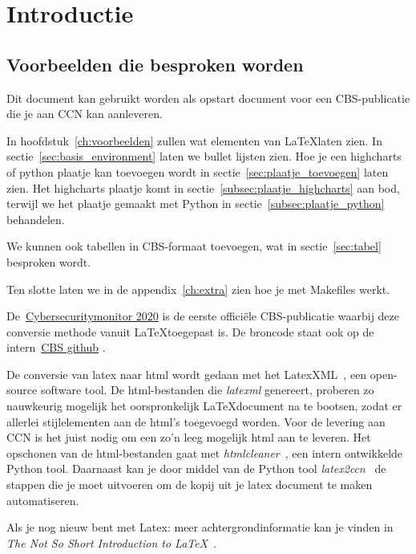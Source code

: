 \chapter{Introductie}
\label{ch:introductie}


\section{Voorbeelden die besproken worden}
Dit document kan gebruikt worden als opstart document voor een CBS-publicatie die je aan CCN kan
aanleveren.

In hoofdstuk~\ref{ch:voorbeelden}  zullen wat elementen van \LaTeX laten zien.
In sectie~\ref{sec:basis_environment} laten we bullet lijsten zien.
Hoe je een highcharts of python plaatje kan toevoegen wordt in sectie~\ref{sec:plaatje_toevoegen}
laten zien.
Het highcharts plaatje komt in sectie~\ref{subsec:plaatje_highcharts} aan bod, terwijl we het
plaatje gemaakt met Python in sectie~\ref{subsec:plaatje_python} behandelen.

We kunnen ook tabellen in CBS-formaat toevoegen, wat in sectie~\ref{sec:tabel} besproken wordt.

Ten slotte laten we in de appendix~\ref{ch:extra} zien hoe je met Makefiles werkt.

De~\href{https://github.cbsp.nl/EVLT/cybersecuritymonitor-2020}{Cybersecuritymonitor 2020}
\citep{cybersecuritymonitor_20} is de eerste officiële CBS-publicatie waarbij
deze conversie methode vanuit \LaTeX toegepast is.
De broncode staat ook op de intern~\href{https://github/evlt/cybersecuritymonitor}{CBS github}
\citep{cybersecuritymonitor_20_github}.

De conversie van latex naar html wordt gedaan met het LatexXML~\citep{latexml}, een open-source
software tool.
De html-bestanden die \emph{latexml} genereert, proberen zo nauwkeurig mogelijk het oorspronkelijk
\LaTeX document na te bootsen, zodat er allerlei stijlelementen aan de html's toegevoegd worden.
Voor de levering aan CCN is het juist nodig om een zo'n leeg mogelijk html aan te leveren.
Het opschonen van de html-bestanden gaat met
\emph{htmlcleaner}~\citep{htmlcleaner_github}, een intern ontwikkelde Python tool.
Daarnaast kan je door middel van de Python tool \emph{latex2ccn}~\citep{latex2ccn_github}  de stappen
die je moet uitvoeren om de kopij uit je latex document te maken automatiseren.


Als je nog nieuw bent met Latex: meer achtergrondinformatie kan je vinden in
\emph{The Not So Short Introduction to \LaTeX}~\citep{latexnottooshort}.




